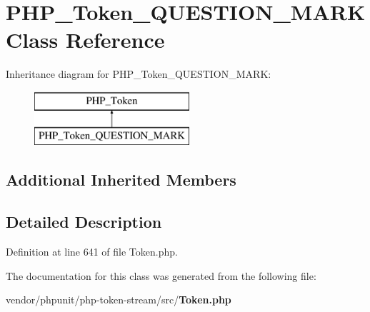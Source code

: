 \section{P\+H\+P\+\_\+\+Token\+\_\+\+Q\+U\+E\+S\+T\+I\+O\+N\+\_\+\+M\+A\+R\+K Class Reference}
\label{class_p_h_p___token___q_u_e_s_t_i_o_n___m_a_r_k}
Inheritance diagram for P\+H\+P\+\_\+\+Token\+\_\+\+Q\+U\+E\+S\+T\+I\+O\+N\+\_\+\+M\+A\+R\+K\+:\begin{figure}[H]
\begin{center}
\leavevmode
\includegraphics[height=2.000000cm]{class_p_h_p___token___q_u_e_s_t_i_o_n___m_a_r_k}
\end{center}
\end{figure}
\subsection*{Additional Inherited Members}


\subsection{Detailed Description}


Definition at line 641 of file Token.\+php.



The documentation for this class was generated from the following file\+:\begin{DoxyCompactItemize}
\item 
vendor/phpunit/php-\/token-\/stream/src/{\bf Token.\+php}\end{DoxyCompactItemize}
